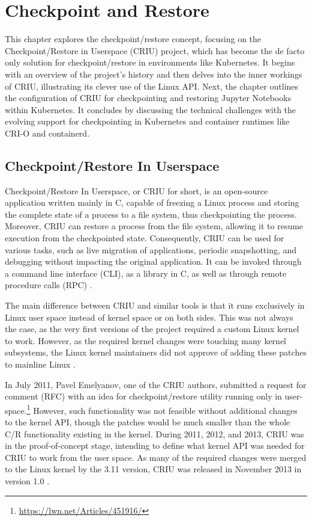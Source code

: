 \documentclass[
  digital,     %
  oneside,     %
  nosansbold,  %
  nocolorbold, %
  lof,         %
  nolot,         %
]{fithesis4}
\begin{document}
\chapter{Checkpoint and Restore}
\label{chap:cr}

This chapter explores the checkpoint/restore concept, focusing on the Checkpoint/Restore in Userspace (CRIU) project, which has become the de facto only solution for checkpoint/restore in environments like Kubernetes. It begins with an overview of the project's history and then delves into the inner workings of CRIU, illustrating its clever use of the Linux API. Next, the chapter outlines the configuration of CRIU for checkpointing and restoring Jupyter Notebooks within Kubernetes. It concludes by discussing the technical challenges with the evolving support for checkpointing in Kubernetes and container runtimes like CRI-O and containerd.

\section{Checkpoint/Restore In Userspace}
Checkpoint/Restore In Userspace, or CRIU for short, is an open-source application written mainly in C, capable of freezing a Linux process and storing the complete state of a process to a file system, thus checkpointing the process. Moreover, CRIU can restore a process from the file system, allowing it to resume execution from the checkpointed state. Consequently, CRIU can be used for various tasks, such as live migration of applications, periodic snapshotting, and debugging without impacting the original application. It can be invoked through a command line interface (CLI), as a library in C, as well as through remote procedure calls (RPC) \cite{criu_main}.

The main difference between CRIU and similar tools is that it runs exclusively in Linux user space instead of kernel space or on both sides. This was not always the case, as the very first versions of the project required a custom Linux kernel to work. However, as the required kernel changes were touching many kernel subsystems, the Linux kernel maintainers did not approve of adding these patches to mainline Linux \cite{criu_podcast}.

In July 2011, Pavel Emelyanov, one of the CRIU authors, submitted a request for comment (RFC) with an idea for checkpoint/restore utility running only in user-space.\footnote{\url{https://lwn.net/Articles/451916/}} However, such functionality was not feasible without additional changes to the kernel API, though the patches would be much smaller than the whole C/R functionality existing in the kernel. During 2011, 2012, and 2013, CRIU was in the proof-of-concept stage, intending to define what kernel API was needed for CRIU to work from the user space. As many of the required changes were merged to the Linux kernel by the 3.11 version, CRIU was released in November 2013 in version 1.0 \cite{criu_history}. 
\end{document}
